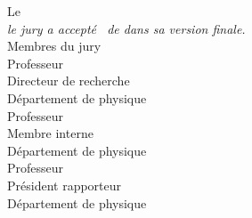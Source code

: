 \begin{comment}
\end{comment}
\makeatletter   %

\newpage
\thispagestyle{empty}
\begin{center}
    \vglue 2cm
    Le \underline{\hspace{5cm}} 
    \\[2cm]
    \scalebox{1} %
    {\it le jury a accepté \leDocument\ de \monsieurMadame\@author dans sa version finale.} 
    \\[2cm]
    Membres du jury\\[2cm]

    Professeur \underline{\hspace{2.5cm}}\\
    Directeur de recherche\\
    Département de physique\\[2cm]
    
    Professeur \underline{\hspace{2.5cm}}\\
    Membre interne\\
    Département de physique\\[2cm]

    Professeur \underline{\hspace{2.5cm}}\\
    Président rapporteur\\
    Département de physique\\[2cm]
\end{center}

\makeatother    %
